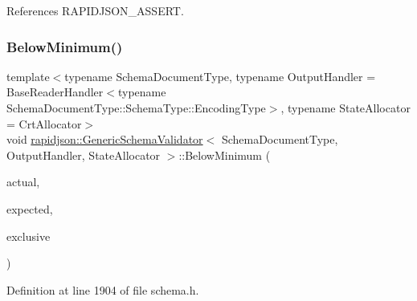 References R\+A\+P\+I\+D\+J\+S\+O\+N\+\_\+\+A\+S\+S\+E\+RT.

\mbox{\label{classrapidjson_1_1_generic_schema_validator_a9b5920ec7704fb3551d7f4b611198ff2}} 
\subsubsection{\texorpdfstring{BelowMinimum()}{BelowMinimum()}\hspace{0.1cm}{\footnotesize\ttfamily [1/3]}}
{\footnotesize\ttfamily template$<$typename Schema\+Document\+Type, typename Output\+Handler = Base\+Reader\+Handler$<$typename Schema\+Document\+Type\+::\+Schema\+Type\+::\+Encoding\+Type$>$, typename State\+Allocator = Crt\+Allocator$>$ \\
void \mbox{\hyperlink{classrapidjson_1_1_generic_schema_validator}{rapidjson\+::\+Generic\+Schema\+Validator}}$<$ Schema\+Document\+Type, Output\+Handler, State\+Allocator $>$\+::Below\+Minimum (\begin{DoxyParamCaption}\item[{\mbox{\hyperlink{stdint_8h_a414156feea104f8f75b4ed9e3121b2f6}{int64\+\_\+t}}}]{actual,  }\item[{const \mbox{\hyperlink{classrapidjson_1_1_generic_schema_validator_a545e4e19bd9419d908bc21e1a7a6170d}{S\+Value}} \&}]{expected,  }\item[{bool}]{exclusive }\end{DoxyParamCaption})}



Definition at line 1904 of file schema.\+h.



